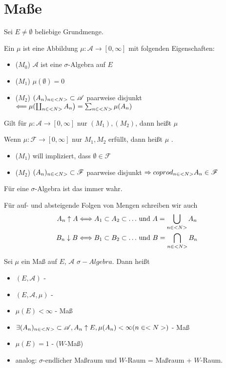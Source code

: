 \section{Maße}

Sei $E \neq \emptyset$ beliebige Grundmenge.

\begin{definition}[Maß]
	Ein  $\mu$ ist eine Abbildung $\mu: \mathscr{A} \to [0,\infty]$ mit folgenden Eigenschaften:
	\begin{itemize}
		\item ($M_0$) $\mathscr{A}$ ist eine $\sigma$-Algebra auf $E$
		\item ($M_1$) $\mu(\emptyset) = 0$
		\item ($M_2$) $(A_n)_{n \in <N>} \subset \mathscr{A}$ paarweise disjunkt $\Longleftarrow \mu(\coprod_{n\in <N>} A_n\big) = \sum_{n\in <N>} \mu(A_n)$
	\end{itemize}
	Gilt für $\mu: \mathscr{A} \to [0,\infty]$ nur $(M_1),(M_2)$, dann heißt $\mu$ 
\end{definition}

\begin{remark}
	Wenn $\mu: \mathscr{F} \to [0,\infty]$ nur $M_1, M_2$ erfüllt, dann heißt $\mu$ .
	\begin{itemize}
		\item ($M_1$) will impliziert, dass $\emptyset \in \mathscr{F}$
		\item ($M_2$) $(A_n)_{n \in <N>} \subset \mathscr{F}$ paarweise disjunkt $\Rightarrow coprod_{n \in <N>} A_n \in \mathscr{F}$
	\end{itemize}
	Für eine $\sigma$-Algebra ist das immer wahr.
\end{remark}

Für auf- und absteigende Folgen von Mengen schreiben wir auch
\begin{align}
	A_n \uparrow A \Longleftrightarrow A_1 \subset A_2 \subset \dots &\text{ und } A = \bigcup_{n\in <N>} A_n \notag \\
	B_n \downarrow B \Longleftrightarrow B_1 \subset B_2 \subset \dots &\text{ und } B = \bigcap_{n\in <N>} B_n \notag
\end{align}

\begin{definition}
	Sei $\mu$ ein Maß auf $E$, $\mathscr{A}$ $\sigma-Algebra$. Dann heißt
	\begin{itemize}
		\item $(E,\mathscr{A})$ - 
		\item $(E,\mathscr{A},\mu)$ - 
		\item $\mu(E) < \infty$ -  Maß
		\item $\exists (A_n)_{n \in <N>} \subset \mathscr{A}, A_n \uparrow E, \mu(A_n) < \infty (n \in <N>)$ -  Maß
		\item $\mu(E) = 1$ -  ($W$-Maß)
		\item analog: $\sigma$-endlicher Maßraum und $W$-Raum = Maßraum + $W$-Raum.
	\end{itemize}
\end{definition}

